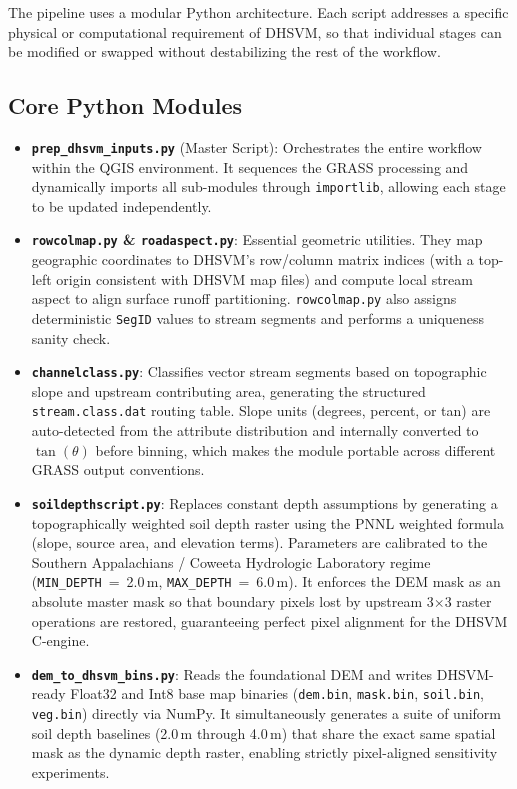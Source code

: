 \documentclass[11pt]{article}
\begin{document}
The pipeline uses a modular Python architecture. Each script addresses a specific physical or computational requirement of DHSVM, so that individual stages can be modified or swapped without destabilizing the rest of the workflow.

\subsection{Core Python Modules}
\begin{itemize}
  \item \textbf{\texttt{prep\_dhsvm\_inputs.py}} (Master Script): Orchestrates the entire workflow within the QGIS environment. It sequences the GRASS processing and dynamically imports all sub-modules through \texttt{importlib}, allowing each stage to be updated independently.
  \item \textbf{\texttt{rowcolmap.py} \& \texttt{roadaspect.py}}: Essential geometric utilities. They map geographic coordinates to DHSVM's row/column matrix indices (with a top-left origin consistent with DHSVM map files) and compute local stream aspect to align surface runoff partitioning. \texttt{rowcolmap.py} also assigns deterministic \texttt{SegID} values to stream segments and performs a uniqueness sanity check.
  \item \textbf{\texttt{channelclass.py}}: Classifies vector stream segments based on topographic slope and upstream contributing area, generating the structured \texttt{stream.class.dat} routing table. Slope units (degrees, percent, or tan) are auto-detected from the attribute distribution and internally converted to $\tan(\theta)$ before binning, which makes the module portable across different GRASS output conventions.
  \item \textbf{\texttt{soildepthscript.py}}: Replaces constant depth assumptions by generating a topographically weighted soil depth raster using the PNNL weighted formula (slope, source area, and elevation terms). Parameters are calibrated to the Southern Appalachians / Coweeta Hydrologic Laboratory regime (\texttt{MIN\_DEPTH}~=~2.0\,m, \texttt{MAX\_DEPTH}~=~6.0\,m). It enforces the DEM mask as an absolute master mask so that boundary pixels lost by upstream 3$\times$3 raster operations are restored, guaranteeing perfect pixel alignment for the DHSVM C-engine.
  \item \textbf{\texttt{dem\_to\_dhsvm\_bins.py}}: Reads the foundational DEM and writes DHSVM-ready Float32 and Int8 base map binaries (\texttt{dem.bin}, \texttt{mask.bin}, \texttt{soil.bin}, \texttt{veg.bin}) directly via NumPy. It simultaneously generates a suite of uniform soil depth baselines (2.0\,m through 4.0\,m) that share the exact same spatial mask as the dynamic depth raster, enabling strictly pixel-aligned sensitivity experiments.

\end{itemize}
\end{document}
